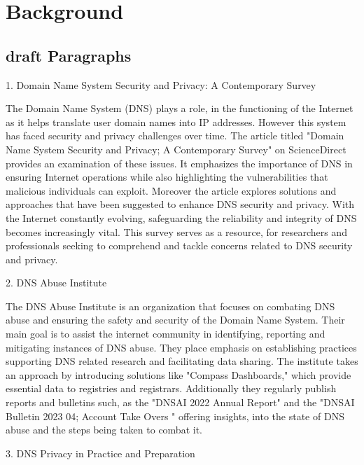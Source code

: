 \chapter{Background}
\label{Chapt2}
\section{draft Paragraphs}
1. Domain Name System Security and Privacy: A Contemporary Survey

The Domain Name System (DNS) plays a role, in the functioning of the Internet as it helps translate user domain names into IP addresses. However this system has faced security and privacy challenges over time. The article titled "Domain Name System Security and Privacy; A Contemporary Survey" on ScienceDirect provides an examination of these issues. It emphasizes the importance of DNS in ensuring Internet operations while also highlighting the vulnerabilities that malicious individuals can exploit. Moreover the article explores solutions and approaches that have been suggested to enhance DNS security and privacy. With the Internet constantly evolving, safeguarding the reliability and integrity of DNS becomes increasingly vital. This survey serves as a resource, for researchers and professionals seeking to comprehend and tackle concerns related to DNS security and privacy.


2. DNS Abuse Institute

The DNS Abuse Institute is an organization that focuses on combating DNS abuse and ensuring the safety and security of the Domain Name System. Their main goal is to assist the internet community in identifying, reporting and mitigating instances of DNS abuse. They place emphasis on establishing practices supporting DNS related research and facilitating data sharing. The institute takes an approach by introducing solutions like "Compass Dashboards," which provide essential data to registries and registrars. Additionally they regularly publish reports and bulletins such, as the "DNSAI 2022 Annual Report" and the "DNSAI Bulletin 2023 04; Account Take Overs " offering insights, into the state of DNS abuse and the steps being taken to combat it.


3. DNS Privacy in Practice and Preparation


